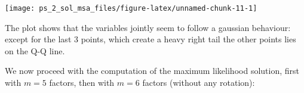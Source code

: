 \documentclass[
]{article}
\newenvironment{Shaded}{\begin{snugshade}}{\end{snugshade}}
\newcommand{\AttributeTok}[1]{\textcolor[rgb]{0.13,0.29,0.53}{#1}}
\newcommand{\DecValTok}[1]{\textcolor[rgb]{0.00,0.00,0.81}{#1}}
\newcommand{\FunctionTok}[1]{\textcolor[rgb]{0.13,0.29,0.53}{\textbf{#1}}}
\newcommand{\NormalTok}[1]{#1}
\newcommand{\OtherTok}[1]{\textcolor[rgb]{0.56,0.35,0.01}{#1}}
\newcommand{\SpecialCharTok}[1]{\textcolor[rgb]{0.81,0.36,0.00}{\textbf{#1}}}
\newcommand{\StringTok}[1]{\textcolor[rgb]{0.31,0.60,0.02}{#1}}
\theoremstyle{plain}
\begin{document}
\begin{center}\texttt{[image: ps\_2\_sol\_msa\_files/figure-latex/unnamed-chunk-11-1]} \end{center}

The plot shows that the variables jointly seem to follow a gaussian
behaviour: except for the last \(3\) points, which create a heavy right
tail the other points lies on the Q-Q line.

We now proceed with the computation of the maximum likelihood solution,
first with \(m = 5\) factors, then with \(m = 6\) factors (without any
rotation): \smallskip

\begin{Shaded}
\end{Shaded}
\end{document}
